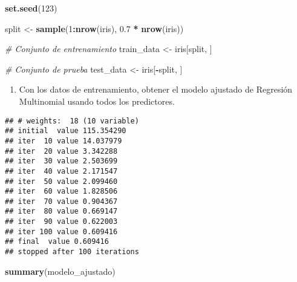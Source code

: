 \documentclass[
]{article}
\newenvironment{Shaded}{\begin{snugshade}}{\end{snugshade}}
\newcommand{\AttributeTok}[1]{\textcolor[rgb]{0.13,0.29,0.53}{#1}}
\newcommand{\CommentTok}[1]{\textcolor[rgb]{0.56,0.35,0.01}{\textit{#1}}}
\newcommand{\DecValTok}[1]{\textcolor[rgb]{0.00,0.00,0.81}{#1}}
\newcommand{\FloatTok}[1]{\textcolor[rgb]{0.00,0.00,0.81}{#1}}
\newcommand{\FunctionTok}[1]{\textcolor[rgb]{0.13,0.29,0.53}{\textbf{#1}}}
\newcommand{\NormalTok}[1]{#1}
\newcommand{\OtherTok}[1]{\textcolor[rgb]{0.56,0.35,0.01}{#1}}
\newcommand{\SpecialCharTok}[1]{\textcolor[rgb]{0.81,0.36,0.00}{\textbf{#1}}}
\newcommand{\StringTok}[1]{\textcolor[rgb]{0.31,0.60,0.02}{#1}}
\providecommand{\tightlist}{%
  \setlength{\itemsep}{0pt}\setlength{\parskip}{0pt}}
\begin{document}
\begin{Shaded}
\begin{Highlighting}[]
\FunctionTok{set.seed}\NormalTok{(}\DecValTok{123}\NormalTok{)}

\NormalTok{split }\OtherTok{\textless{}{-}} \FunctionTok{sample}\NormalTok{(}\DecValTok{1}\SpecialCharTok{:}\FunctionTok{nrow}\NormalTok{(iris), }\FloatTok{0.7} \SpecialCharTok{*} \FunctionTok{nrow}\NormalTok{(iris))}

\CommentTok{\# Conjunto de entrenamiento}
\NormalTok{train\_data }\OtherTok{\textless{}{-}}\NormalTok{ iris[split, ]}

\CommentTok{\# Conjunto de prueba}
\NormalTok{test\_data }\OtherTok{\textless{}{-}}\NormalTok{ iris[}\SpecialCharTok{{-}}\NormalTok{split, ]}
\end{Highlighting}
\end{Shaded}

\begin{enumerate}
\def\labelenumi{\arabic{enumi})}
\setcounter{enumi}{2}
\tightlist
\item
  Con los datos de entrenamiento, obtener el modelo ajustado de
  Regresión Multinomial usando todos los predictores.
\end{enumerate}

\begin{Shaded}
\end{Shaded}

\begin{verbatim}
## # weights:  18 (10 variable)
## initial  value 115.354290 
## iter  10 value 14.037979
## iter  20 value 3.342288
## iter  30 value 2.503699
## iter  40 value 2.171547
## iter  50 value 2.099460
## iter  60 value 1.828506
## iter  70 value 0.904367
## iter  80 value 0.669147
## iter  90 value 0.622003
## iter 100 value 0.609416
## final  value 0.609416 
## stopped after 100 iterations
\end{verbatim}

\begin{Shaded}
\begin{Highlighting}[]
\FunctionTok{summary}\NormalTok{(modelo\_ajustado)}
\end{Highlighting}
\end{Shaded}
\end{document}
